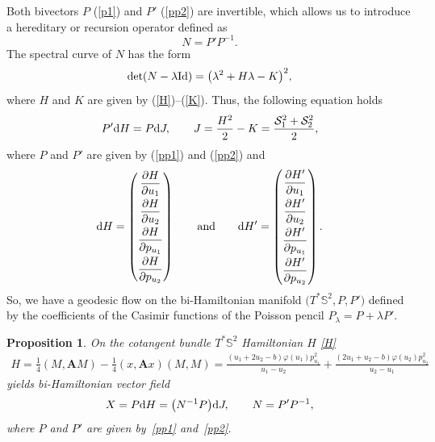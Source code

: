 \documentclass[10pt,a4paper]{amsart}
\numberwithin{equation}{section}
\newtheorem{Proposition}[Theorem]{Proposition}
 { \theoremstyle{definition}
\newtheorem{Definition}[Theorem]{Definition}
\newtheorem{Note}[Theorem]{Note}
\newtheorem{Example}[Theorem]{Example}
\newtheorem{Remark}[Theorem]{Remark} }
\begin{document}
Both bivectors $P$ (\ref{p1}) and $P'$ (\ref{pp2}) are invertible, which allows us to introduce a hereditary or recursion operator defined as
\[N=P' P^{-1} .\]
The spectral curve of $N$ has the form
\[
\det(N-\lambda {\rm Id})=\big(\lambda^2+H\lambda-K\big)^2 ,
\]
where $H$ and $K$ are given by (\ref{H})--(\ref{K}). Thus, the following equation holds
\begin{equation*}%
P'{\rm d}H=P{\rm d}J ,\qquad J=\frac{H^2}{2}-K=\frac{\mathcal{S}_1^2+\mathcal{S}_2^2}{2},
\end{equation*}
 where $P$ and $P'$ are given by (\ref{pp1}) and (\ref{pp2}) and
\[
{\rm d}H=\left(
 \begin{matrix}
 \dfrac{\partial H}{\partial u_1} \vspace{1mm}\\
 \dfrac{\partial H}{\partial u_2} \vspace{1mm}\\
 \dfrac{\partial H}{\partial p_{u_1}} \vspace{1mm}\\
 \dfrac{\partial H}{\partial p_{u_2}}
 \end{matrix}
 \right)\qquad\mbox{and}\qquad
{\rm d}H'=\left(
 \begin{matrix}
 \dfrac{\partial H'}{\partial u_1} \vspace{1mm}\\
 \dfrac{\partial H'}{\partial u_2} \vspace{1mm}\\
 \dfrac{\partial H'}{\partial p_{u_1}} \vspace{1mm}\\
 \dfrac{\partial H'}{\partial p_{u_2}}
 \end{matrix}
 \right) .
\]
So, we have a geodesic flow on the bi-Hamiltonian manifold $\big(T^*\mathbb S^2, P, P'\big)$ defined by the coefficients of the Casimir functions of the Poisson pencil $P_\lambda=P+\lambda P'$.
\begin{Proposition}
On the cotangent bundle $T^*\mathbb S^2$ Hamiltonian $H$ \eqref{H}
\begin{gather*}
H=\frac{1}{4}(M,\mathbf AM)-\frac{1}{4}(x,\mathbf Ax)(M,M)
=\frac{(u_1+2u_2-b)\varphi(u_1)p_{u_1}^2}{u_1-u_2}+\frac{( 2u_1 + u_2-b)\varphi(u_2)p_{u_2}^2}{u_2 - u_1}
\end{gather*}
yields bi-Hamiltonian vector field
\[
X=P{\rm d}H=\bigl(N^{-1}P\bigr) {\rm d}J , \qquad N=P' P^{-1},
\]
where $P$ and $P'$ are given by~\eqref{pp1} and~\eqref{pp2}.
\end{Proposition}
\end{document}
